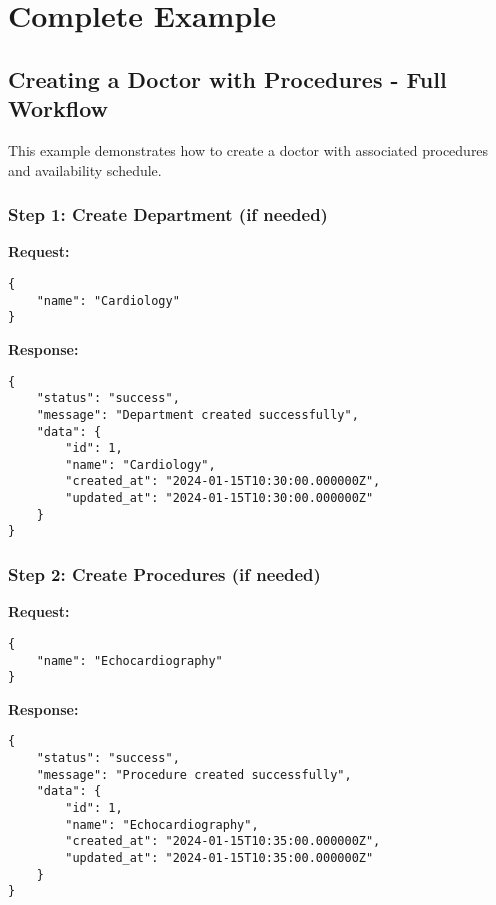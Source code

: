 \documentclass[12pt,a4paper]{article}
\begin{document}
\section{Complete Example}

\subsection{Creating a Doctor with Procedures - Full Workflow}

This example demonstrates how to create a doctor with associated procedures and availability schedule.

\subsubsection{Step 1: Create Department (if needed)}
\textbf{Request:}
\begin{lstlisting}[caption=POST /api/departments]
{
    "name": "Cardiology"
}
\end{lstlisting}

\textbf{Response:}
\begin{lstlisting}[caption=Department Creation Response]
{
    "status": "success",
    "message": "Department created successfully",
    "data": {
        "id": 1,
        "name": "Cardiology",
        "created_at": "2024-01-15T10:30:00.000000Z",
        "updated_at": "2024-01-15T10:30:00.000000Z"
    }
}
\end{lstlisting}

\subsubsection{Step 2: Create Procedures (if needed)}
\textbf{Request:}
\begin{lstlisting}[caption=POST /api/procedures]
{
    "name": "Echocardiography"
}
\end{lstlisting}

\textbf{Response:}
\begin{lstlisting}[caption=Procedure Creation Response]
{
    "status": "success",
    "message": "Procedure created successfully",
    "data": {
        "id": 1,
        "name": "Echocardiography",
        "created_at": "2024-01-15T10:35:00.000000Z",
        "updated_at": "2024-01-15T10:35:00.000000Z"
    }
}
\end{lstlisting}
\end{document}
